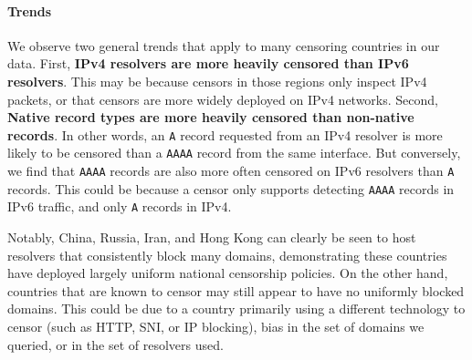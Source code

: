 
%




\paragraph{Trends}
We observe two general trends that apply to many censoring countries in our data.
First, \textbf{IPv4 resolvers are more heavily censored than IPv6 resolvers}.
This may be because censors in those regions only inspect IPv4 packets, or that
censors are more widely deployed on IPv4 networks. Second, \textbf{Native record
types are more heavily censored than non-native records}. In other words, an
\texttt{A} record requested from an IPv4 resolver is more likely to be censored
than a \texttt{AAAA} record from the same interface. But conversely, we find
that \texttt{AAAA} records are also more often censored on IPv6 resolvers than
\texttt{A} records. This could be because a censor only supports detecting
\texttt{AAAA} records in IPv6 traffic, and only \texttt{A} records in IPv4.


Notably, China, Russia, Iran, and Hong Kong can clearly be seen to host
resolvers that consistently block many domains, demonstrating these countries have
deployed largely uniform national censorship policies. On the other hand,
countries that are known to censor may still appear to have no uniformly blocked
domains. This could be due to a country primarily using a different technology
to censor (such as HTTP, SNI, or IP blocking), bias in the set of domains we
queried, or in the set of resolvers used.

